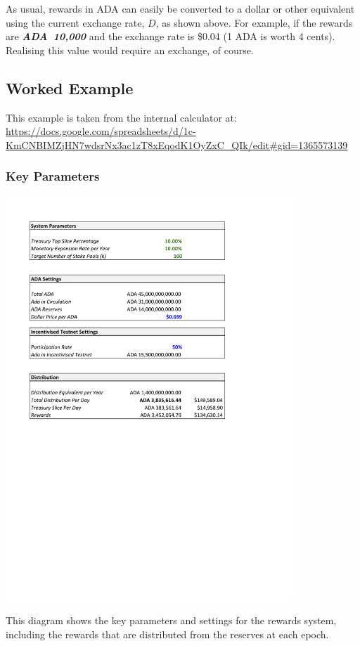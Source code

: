 \documentclass[11pt,a4paper,dvipsnames,twosided]{article}
\newcommand{\ada}{ADA{}}
\newcommand{\ADA}[1]{\textbf{\emph{\ada~{#1}}}}
\begin{document}
\noindent
As usual, rewards in \ada{} can easily be converted to a dollar or other equivalent using
the current exchange rate, $D$, as shown %
above.  For example, if the rewards are \ADA{10,000} and the exchange rate is
\$0.04 (1 \ada{} is worth 4 cents).  Realising this value would require an exchange,
of course.

\clearpage
\subsection{Worked Example}


This example is taken from the \IOHK{} internal calculator at:
\url{https://docs.google.com/spreadsheets/d/1c-KmCNBIMZjHN7wdsrNx3ac1zT8xEqodK1OyZxC_QIk/edit#gid=1365573139}

\subsubsection*{Key Parameters}
\includegraphics[height=6in]{RC1.pdf}

\noindent
This diagram shows the key parameters and settings for the rewards system, including the
rewards that are distributed from the reserves at each epoch.
\end{document}
